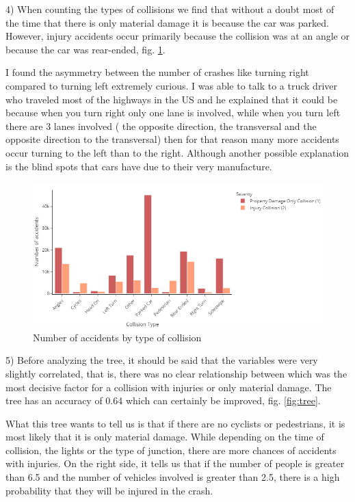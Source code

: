 \documentclass[12pt]{article}
\begin{document}
  4) When counting the types of collisions we find that without a doubt most of the time that there is only material damage it is because the car was parked. However, injury accidents occur primarily because the collision was at an angle or because the car was rear-ended, fig. \ref{fig:collitiotype}. 

  I found the asymmetry between the number of crashes like turning right compared to turning left extremely curious. I was able to talk to a truck driver who traveled most of the highways in the US and he explained that it could be because when you turn right only one lane is involved, while when you turn left there are 3 lanes involved ( the opposite direction, the transversal and the opposite direction to the transversal) then for that reason many more accidents occur turning to the left than to the right. Although another possible explanation is the blind spots that cars have due to their very manufacture. \\


  \begin{figure}[htbp]
    \centering
      \includegraphics[width=1\textwidth]{../images/collition_type.png}
    \caption{Number of accidents by type of collision}
    \label{fig:collitiotype}
  \end{figure}
  5) Before analyzing the tree, it should be said that the variables were very slightly correlated, that is, there was no clear relationship between which was the most decisive factor for a collision with injuries or only material damage. The tree has an accuracy of 0.64 which can certainly be improved, fig. \ref{fig:tree}.

  What this tree wants to tell us is that if there are no cyclists or pedestrians, it is most likely that it is only material damage. While depending on the time of collision, the lights or the type of junction, there are more chances of accidents with injuries. On the right side, it tells us that if the number of people is greater than 6.5 and the number of vehicles involved is greater than 2.5, there is a high probability that they will be injured in the crash.\\
\end{document}
